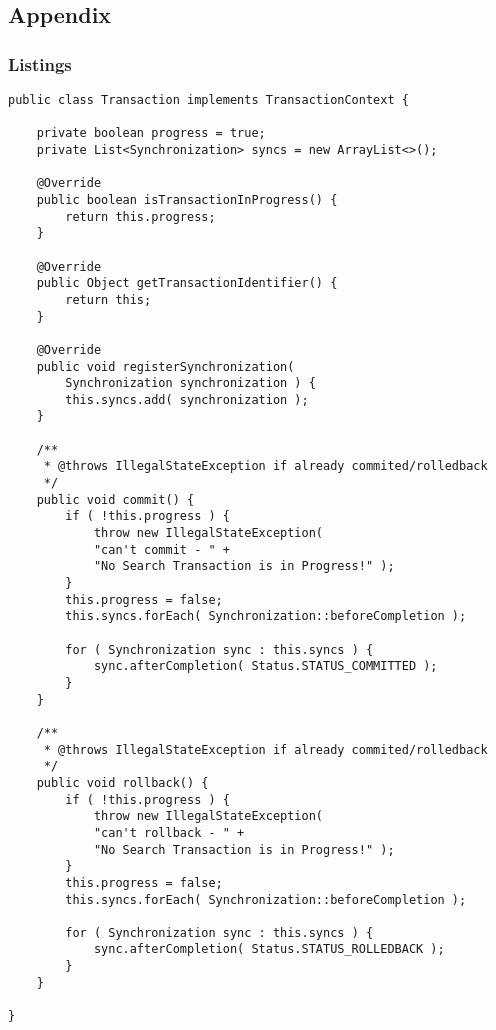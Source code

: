 \subsection{Appendix}\label{appendix}

\subsubsection{Listings}

\lstset{language=java}
\begin{lstlisting}[frame=htrbl, caption={the simple Transaction contract}, label={lst:Transaction.java}]
public class Transaction implements TransactionContext {

	private boolean progress = true;
	private List<Synchronization> syncs = new ArrayList<>();
	
	@Override
	public boolean isTransactionInProgress() {
		return this.progress;
	}
	
	@Override
	public Object getTransactionIdentifier() {
		return this;
	}
	
	@Override
	public void registerSynchronization(
		Synchronization synchronization ) {
		this.syncs.add( synchronization );
	}
	
	/**
	 * @throws IllegalStateException if already commited/rolledback
	 */
	public void commit() {
		if ( !this.progress ) {
			throw new IllegalStateException( 
			"can't commit - " + 
			"No Search Transaction is in Progress!" );
		}
		this.progress = false;
		this.syncs.forEach( Synchronization::beforeCompletion );
		
		for ( Synchronization sync : this.syncs ) {
			sync.afterCompletion( Status.STATUS_COMMITTED );
		}
	}
	
	/**
     * @throws IllegalStateException if already commited/rolledback
 	 */
	public void rollback() {
		if ( !this.progress ) {
			throw new IllegalStateException( 
			"can't rollback - " + 
			"No Search Transaction is in Progress!" );
		}
		this.progress = false;
		this.syncs.forEach( Synchronization::beforeCompletion );
	
		for ( Synchronization sync : this.syncs ) {
			sync.afterCompletion( Status.STATUS_ROLLEDBACK );
		}
	}

}
\end{lstlisting}

